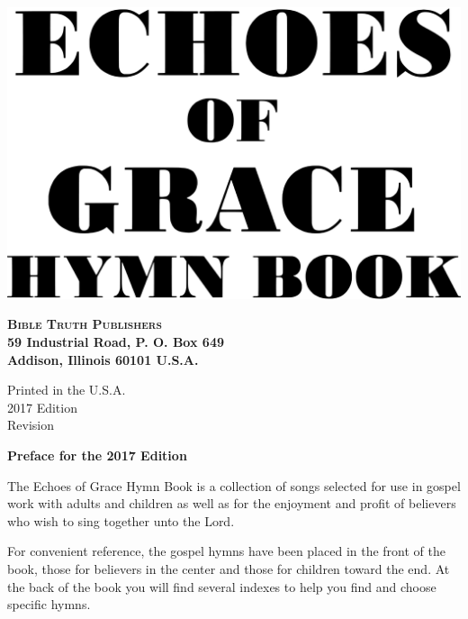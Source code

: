 \documentclass{book}
\begin{document}

\vspace*{1in}

\noindent\hfil\includegraphics[scale=0.06]{booklayout/bodoni-scan.pdf}\hfil

\vfill

\begin{center}
\textbf{
\large\textsc{Bible Truth Publishers}\\
\small{59 Industrial Road, P. O. Box 649\\
Addison, Illinois 60101 U.S.A.\\
}
}
\end{center}

\pagebreak

\vspace*{\fill}
\begin{center}
Printed in the U.S.A.\\
2017 Edition\\
Revision 
\end{center}

\pagebreak


\vspace*{1in}
\noindent\hfil{\textbf{Preface for the 2017 Edition}}\hfil

The {\textit{}Echoes of Grace Hymn Book} is a collection of songs selected for
use in gospel work with adults and children as well as for the enjoyment and
profit of believers who wish to sing together unto the Lord.

For convenient reference, the gospel hymns have been placed in the front of the
book, those for believers in the center and those for children toward the end.
At the back of the book you will find several indexes to help you find and
choose specific hymns.
\end{document}

